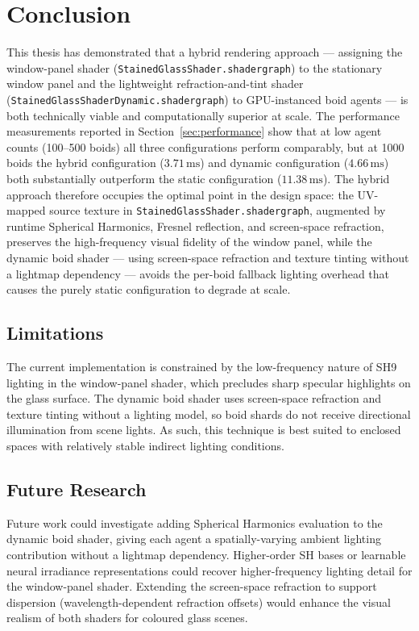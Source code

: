 \documentclass[12pt]{article}
\begin{document}
\section{Conclusion}
This thesis has demonstrated that a hybrid rendering approach --- assigning the window-panel shader (\texttt{StainedGlassShader.shadergraph}) to the stationary window panel and the lightweight refraction-and-tint shader (\texttt{StainedGlassShaderDynamic.shadergraph}) to GPU-instanced boid agents --- is both technically viable and computationally superior at scale. The performance measurements reported in Section~\ref{sec:performance} show that at low agent counts (100--500 boids) all three configurations perform comparably, but at 1000 boids the hybrid configuration ($3.71\,\text{ms}$) and dynamic configuration ($4.66\,\text{ms}$) both substantially outperform the static configuration ($11.38\,\text{ms}$). The hybrid approach therefore occupies the optimal point in the design space: the UV-mapped source texture in \texttt{StainedGlassShader.shadergraph}, augmented by runtime Spherical Harmonics, Fresnel reflection, and screen-space refraction, preserves the high-frequency visual fidelity of the window panel, while the dynamic boid shader --- using screen-space refraction and texture tinting without a lightmap dependency --- avoids the per-boid fallback lighting overhead that causes the purely static configuration to degrade at scale.

\subsection*{Limitations}

The current implementation is constrained by the low-frequency nature of SH9 lighting in the window-panel shader, which precludes sharp specular highlights on the glass surface. The dynamic boid shader uses screen-space refraction and texture tinting without a lighting model, so boid shards do not receive directional illumination from scene lights. As such, this technique is best suited to enclosed spaces with relatively stable indirect lighting conditions.

\subsection*{Future Research}

Future work could investigate adding Spherical Harmonics evaluation to the dynamic boid shader, giving each agent a spatially-varying ambient lighting contribution without a lightmap dependency. Higher-order SH bases or learnable neural irradiance representations could recover higher-frequency lighting detail for the window-panel shader. Extending the screen-space refraction to support dispersion (wavelength-dependent refraction offsets) would enhance the visual realism of both shaders for coloured glass scenes.
\end{document}
